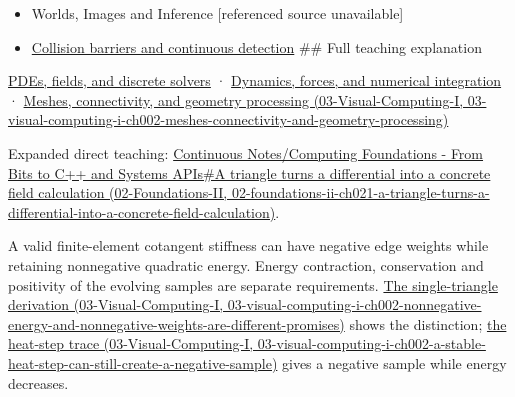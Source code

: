 \begin{itemize}
\item
  {Worlds, Images and Inference {[}referenced source unavailable{]}}
\item
  \hyperref[appendix-a9ba01fa72a6]{Collision barriers and continuous detection} \#\# Full teaching explanation
\end{itemize}

\hyperref[04-visual-computing-ii-ch030-pdes-fields-and-discrete-solvers]{PDEs, fields, and discrete solvers} · \hyperref[04-visual-computing-ii-ch029-dynamics-forces-and-numerical-integration]{Dynamics, forces, and numerical integration} · \href{../03-Visual-Computing-I/main.pdf\#nameddest=03-visual-computing-i-ch002-meshes-connectivity-and-geometry-processing}{Meshes, connectivity, and geometry processing (03-Visual-Computing-I, 03-visual-computing-i-ch002-meshes-connectivity-and-geometry-processing)}

Expanded direct teaching: \href{../02-Foundations-II/main.pdf\#nameddest=02-foundations-ii-ch021-a-triangle-turns-a-differential-into-a-concrete-field-calculation}{Continuous Notes/Computing Foundations - From Bits to C++ and Systems APIs\#A triangle turns a differential into a concrete field calculation (02-Foundations-II, 02-foundations-ii-ch021-a-triangle-turns-a-differential-into-a-concrete-field-calculation)}.

A valid finite-element cotangent stiffness can have negative edge weights while retaining nonnegative quadratic energy. Energy contraction, conservation and positivity of the evolving samples are separate requirements. \href{../03-Visual-Computing-I/main.pdf\#nameddest=03-visual-computing-i-ch002-nonnegative-energy-and-nonnegative-weights-are-different-promises}{The single-triangle derivation (03-Visual-Computing-I, 03-visual-computing-i-ch002-nonnegative-energy-and-nonnegative-weights-are-different-promises)} shows the distinction; \href{../03-Visual-Computing-I/main.pdf\#nameddest=03-visual-computing-i-ch002-a-stable-heat-step-can-still-create-a-negative-sample}{the heat-step trace (03-Visual-Computing-I, 03-visual-computing-i-ch002-a-stable-heat-step-can-still-create-a-negative-sample)} gives a negative sample while energy decreases.
